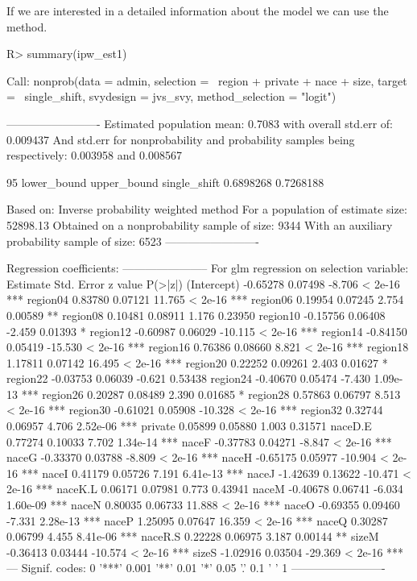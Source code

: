 \documentclass[
]{jss}
\begin{document}
If we are interested in a detailed information about the model we can
use the  method.

\begin{CodeChunk}
\begin{CodeInput}
R> summary(ipw_est1)
\end{CodeInput}
\begin{CodeOutput}

Call:
nonprob(data = admin, selection = ~region + private + nace + 
    size, target = ~single_shift, svydesign = jvs_svy, method_selection = "logit")

-------------------------
Estimated population mean: 0.7083 with overall std.err of: 0.009437
And std.err for nonprobability and probability samples being respectively:
0.003958 and 0.008567

95%
             lower_bound upper_bound
single_shift   0.6898268   0.7268188


Based on: Inverse probability weighted method
For a population of estimate size: 52898.13
Obtained on a nonprobability sample of size: 9344
With an auxiliary probability sample of size: 6523
-------------------------

Regression coefficients:
-----------------------
For glm regression on selection variable:
            Estimate Std. Error z value  P(>|z|)    
(Intercept) -0.65278    0.07498  -8.706  < 2e-16 ***
region04     0.83780    0.07121  11.765  < 2e-16 ***
region06     0.19954    0.07245   2.754  0.00589 ** 
region08     0.10481    0.08911   1.176  0.23950    
region10    -0.15756    0.06408  -2.459  0.01393 *  
region12    -0.60987    0.06029 -10.115  < 2e-16 ***
region14    -0.84150    0.05419 -15.530  < 2e-16 ***
region16     0.76386    0.08660   8.821  < 2e-16 ***
region18     1.17811    0.07142  16.495  < 2e-16 ***
region20     0.22252    0.09261   2.403  0.01627 *  
region22    -0.03753    0.06039  -0.621  0.53438    
region24    -0.40670    0.05474  -7.430 1.09e-13 ***
region26     0.20287    0.08489   2.390  0.01685 *  
region28     0.57863    0.06797   8.513  < 2e-16 ***
region30    -0.61021    0.05908 -10.328  < 2e-16 ***
region32     0.32744    0.06957   4.706 2.52e-06 ***
private      0.05899    0.05880   1.003  0.31571    
naceD.E      0.77274    0.10033   7.702 1.34e-14 ***
naceF       -0.37783    0.04271  -8.847  < 2e-16 ***
naceG       -0.33370    0.03788  -8.809  < 2e-16 ***
naceH       -0.65175    0.05977 -10.904  < 2e-16 ***
naceI        0.41179    0.05726   7.191 6.41e-13 ***
naceJ       -1.42639    0.13622 -10.471  < 2e-16 ***
naceK.L      0.06171    0.07981   0.773  0.43941    
naceM       -0.40678    0.06741  -6.034 1.60e-09 ***
naceN        0.80035    0.06733  11.888  < 2e-16 ***
naceO       -0.69355    0.09460  -7.331 2.28e-13 ***
naceP        1.25095    0.07647  16.359  < 2e-16 ***
naceQ        0.30287    0.06799   4.455 8.41e-06 ***
naceR.S      0.22228    0.06975   3.187  0.00144 ** 
sizeM       -0.36413    0.03444 -10.574  < 2e-16 ***
sizeS       -1.02916    0.03504 -29.369  < 2e-16 ***
---
Signif. codes:  0 '***' 0.001 '**' 0.01 '*' 0.05 '.' 0.1 ' ' 1
-------------------------


\end{CodeOutput}
\end{CodeChunk}
\end{document}

